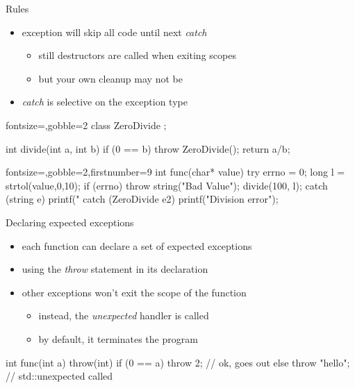 \begin{frame}[fragile]
  \begin{block}{Rules}
    \begin{itemize}
    \item exception will skip all code until next {\it catch}
    \begin{itemize}
      \item still destructors are called when exiting scopes
      \item but your own cleanup may not be
    \end{itemize}
    \item {\it catch} is selective on the exception type
    \end{itemize}
  \end{block}
  \begin{multicols}{2}
    \begin{cppcode*}{fontsize=\scriptsize,gobble=2}
      class ZeroDivide {};
      
      int divide(int a, int b) {
        if (0 == b) {
          throw ZeroDivide();
        }
        return a/b;
      }
    \end{cppcode*}
    \columnbreak
    \begin{cppcode*}{fontsize=\scriptsize,gobble=2,firstnumber=9} 
      int func(char* value) {
        try {
          errno = 0;
          long l = strtol(value,0,10);
          if (errno) {
            throw string("Bad Value");
          }
          divide(100, l);
        } catch (string e) {
          printf("%
        } catch (ZeroDivide e2) {
          printf("Division error\n");
        }
      }
    \end{cppcode*}
  \end{multicols}
\end{frame}

\begin{frame}[fragile]
  \begin{block}{Declaring expected exceptions}
    \begin{itemize}
    \item each function can declare a set of expected exceptions
    \item using the {\it throw} statement in its declaration
    \item other exceptions won't exit the scope of the function
      \begin{itemize}
      \item instead, the {\it unexpected} handler is called
      \item by default, it terminates the program
      \end{itemize}
    \end{itemize}
  \end{block}
  \pause
  \begin{cppcode}
    int func(int a) throw(int) {
      if (0 == a) {
        throw 2;  // ok, goes out
      } else {
        throw "hello"; // std::unexpected called
      }
    }
  \end{cppcode}
\end{frame}  

